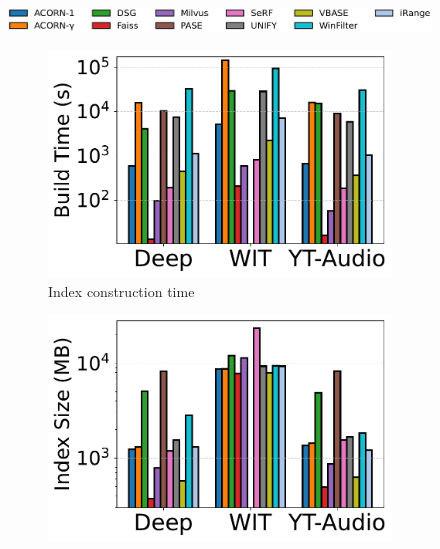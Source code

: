 \documentclass[sigconf, nonacm]{acmart}
\begin{document}
	\begin{figure}[t]
		\centering
		\setlength{\abovecaptionskip}{0.3cm}
		\setlength{\belowcaptionskip}{0cm}
		\hspace*{11pt}
		\includegraphics[width=0.93\columnwidth]{figures/indexData/rangeFilter_legend_only.pdf}
		
		
		\begin{subfigure}[t]{0.32\columnwidth}
			\centering
			\includegraphics[width=\linewidth]{figures/indexData/rangeFilter_build_time_comparison_query.pdf}
			\caption{Index construction time}
			\label{fig:rangeFilter_build_time}
		\end{subfigure}
		\hfill
		\begin{subfigure}[t]{0.32\columnwidth}
			\centering
			\includegraphics[width=\linewidth]{figures/indexData/rangeFilter_index_size_mb_comparison_query.pdf}

\end{subfigure}
\end{figure}
\end{document}
